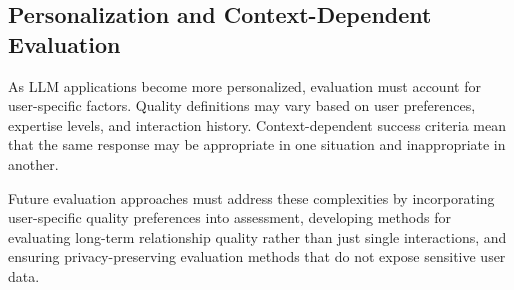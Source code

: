 \subsection{Personalization and Context-Dependent Evaluation}

As LLM applications become more personalized, evaluation must account for user-specific factors. Quality definitions may vary based on user preferences, expertise levels, and interaction history. Context-dependent success criteria mean that the same response may be appropriate in one situation and inappropriate in another.

Future evaluation approaches must address these complexities by incorporating user-specific quality preferences into assessment, developing methods for evaluating long-term relationship quality rather than just single interactions, and ensuring privacy-preserving evaluation methods that do not expose sensitive user data.

